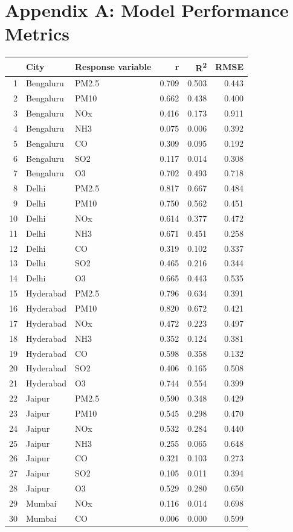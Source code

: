 \documentclass[twoside,11pt]{article}
\begin{document}
\newpage

\section*{Appendix A: Model Performance Metrics}

\begin{table}[ht]
\centering
\begin{tabular}{rllrrr}
  \hline
  & City & Response variable & r & R\textsuperscript{2} & RMSE \\
  \hline
1 & Bengaluru & PM2.5 & 0.709 & 0.503 & 0.443 \\ 
  2 & Bengaluru & PM10 & 0.662 & 0.438 & 0.400 \\ 
  3 & Bengaluru & NOx & 0.416 & 0.173 & 0.911 \\ 
  4 & Bengaluru & NH3 & 0.075 & 0.006 & 0.392 \\ 
  5 & Bengaluru & CO & 0.309 & 0.095 & 0.192 \\ 
  6 & Bengaluru & SO2 & 0.117 & 0.014 & 0.308 \\ 
  7 & Bengaluru & O3 & 0.702 & 0.493 & 0.718 \\ 
  8 & Delhi & PM2.5 & 0.817 & 0.667 & 0.484 \\ 
  9 & Delhi & PM10 & 0.750 & 0.562 & 0.451 \\ 
  10 & Delhi & NOx & 0.614 & 0.377 & 0.472 \\ 
  11 & Delhi & NH3 & 0.671 & 0.451 & 0.258 \\ 
  12 & Delhi & CO & 0.319 & 0.102 & 0.337 \\ 
  13 & Delhi & SO2 & 0.465 & 0.216 & 0.344 \\ 
  14 & Delhi & O3 & 0.665 & 0.443 & 0.535 \\ 
  15 & Hyderabad & PM2.5 & 0.796 & 0.634 & 0.391 \\ 
  16 & Hyderabad & PM10 & 0.820 & 0.672 & 0.421 \\ 
  17 & Hyderabad & NOx & 0.472 & 0.223 & 0.497 \\ 
  18 & Hyderabad & NH3 & 0.352 & 0.124 & 0.381 \\ 
  19 & Hyderabad & CO & 0.598 & 0.358 & 0.132 \\ 
  20 & Hyderabad & SO2 & 0.406 & 0.165 & 0.508 \\ 
  21 & Hyderabad & O3 & 0.744 & 0.554 & 0.399 \\ 
  22 & Jaipur & PM2.5 & 0.590 & 0.348 & 0.429 \\ 
  23 & Jaipur & PM10 & 0.545 & 0.298 & 0.470 \\ 
  24 & Jaipur & NOx & 0.532 & 0.284 & 0.440 \\ 
  25 & Jaipur & NH3 & 0.255 & 0.065 & 0.648 \\ 
  26 & Jaipur & CO & 0.321 & 0.103 & 0.273 \\ 
  27 & Jaipur & SO2 & 0.105 & 0.011 & 0.394 \\ 
  28 & Jaipur & O3 & 0.529 & 0.280 & 0.650 \\ 
  29 & Mumbai & NOx & 0.116 & 0.014 & 0.698 \\ 
  30 & Mumbai & CO & 0.006 & 0.000 & 0.599 \\ 
    \hline
\end{tabular}
\end{table}
\end{document}
